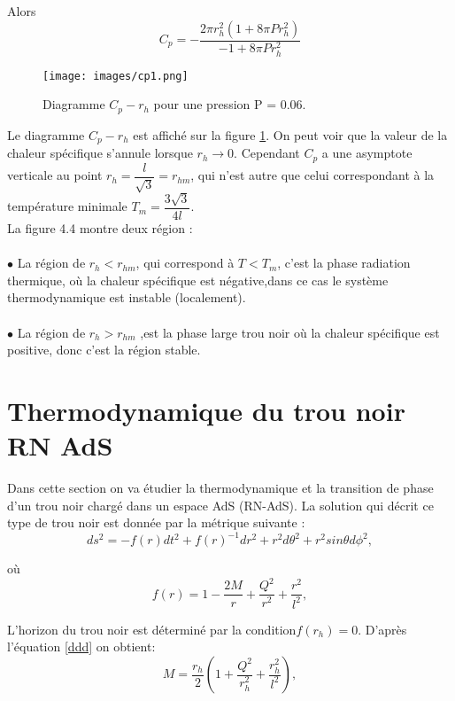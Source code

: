 \documentclass[12pt,  a4paper, openright]{report} %
\begin{document}
Alors
\begin{equation}
C_{p}=-\dfrac{2\pi r_{h}^{2}(1+8\pi Pr_{h}^{2})}{-1+8\pi Pr_{h}^{2}}
\end{equation}

\begin{figure}[H]
	\begin{center}
		\texttt{[image: images/cp1.png]}
		\caption{Diagramme $C_{p}-r_{h}$ pour une pression P = 0.06.}
		\label{cprhh}
	\end{center}
\end{figure}

Le diagramme $C_{p} - r_{h}$ est affiché sur la figure \ref{cprhh}. On peut voir que la valeur de la chaleur spécifique s’annule lorsque $r_{h}\longrightarrow 0$. Cependant $C_{p}$ a une asymptote verticale au point $r_{h} = \dfrac{l}{\sqrt{3}} =r_{hm}$, qui n’est autre que celui correspondant à la température minimale $T_{m}=\dfrac{3\sqrt{3}}{4 l}$.\\
La figure 4.4 montre deux région :\\
\\
$\bullet$ La région de $r_{h} < r_{hm}$, qui correspond à $ T < T_{m}$, c’est la phase radiation thermique, où la chaleur spécifique est négative,dans ce cas le système thermodynamique est instable (localement).\\
\\
$\bullet$ La région de $r_{h} > r_{hm}$ ,est la phase large trou noir où la chaleur spécifique est positive, donc c’est la région stable.

\section{Thermodynamique du trou noir RN AdS}
Dans cette section on va étudier la thermodynamique et la transition de phase d’un
trou noir chargé dans un espace AdS (RN-AdS). La solution qui décrit ce type de trou
noir est donnée par la métrique suivante :
\begin{equation}
ds^{2}=-f(r)dt^{2}+f(r)^{-1}dr^{2}+r^{2}d\theta^{2}+r^{2}sin\theta d\phi^{2},
\end{equation}

où
\begin{equation}
\label{ddd}
f(r)=1-\dfrac{2M}{r}+\dfrac{Q^{2}}{r^{2}}+\dfrac{r^{2}}{l^{2}},
\end{equation}

L’horizon du trou noir est déterminé par la condition$ f(r_{h}) = 0$. D’après l’équation \ref{ddd} on obtient:
\begin{equation}
\label{xx}
M=\dfrac{r_{h}}{2}\left( 1+\dfrac{Q^{2}}{r_{h}^{2}}+\dfrac{r_{h}^{2}}{l^{2}}\right) ,
\end{equation}
\end{document}

